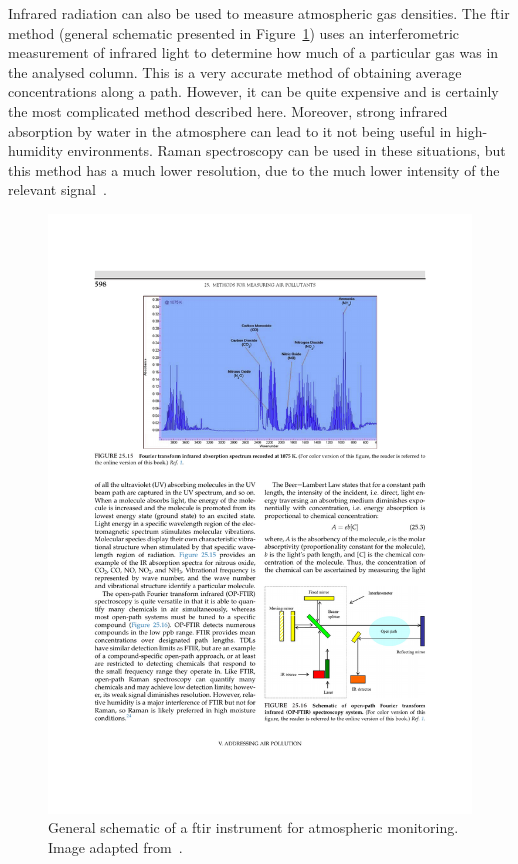 Infrared radiation can also be used to measure atmospheric gas
densities. The \gls{ftir} method (general schematic presented in
Figure~\ref{fig:ap_monitoring_ftir}) uses an interferometric measurement
of infrared light to determine how much of a particular gas was in the
analysed column. This is a very accurate method of obtaining average
concentrations along a path. However, it can be quite expensive and is
certainly the most complicated method described here. Moreover, strong
infrared absorption by water in the atmosphere can lead to it not being
useful in high-humidity environments. Raman spectroscopy can be used in
these situations, but this method has a much lower resolution, due to
the much lower intensity of the relevant signal~\cite{Vallero2014}.

\begin{figure}[htpb]
    \centering
    \includegraphics[trim=10.5cm 5.5cm 2cm 18cm,%
        clip, frame, width=.8\textwidth]{img/pdf/vallero_ftir_588.pdf}
    \caption{General schematic of a \gls{ftir} instrument for
    atmospheric monitoring. Image adapted from~\cite{Vallero2014}.}%
    \label{fig:ap_monitoring_ftir}
\end{figure}

